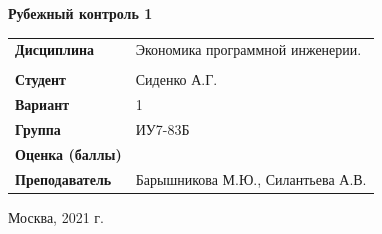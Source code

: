 \documentclass[a4paper,14pt]{extreport} %
\begin{document}
\begin{titlepage}
    \vspace{2cm}

    \begin{center}
        \textbf{Рубежный контроль 1} \\
        \vspace{0.5cm}
    \end{center}

    \vspace{4cm}

    \begin{flushleft}
        \begin{tabular}{ll}
            \textbf{Дисциплина} & Экономика программной инженерии.  \\
            \\
            \textbf{Студент} & Сиденко А.Г. \\
             \textbf{Вариант} & 1 \\
            \textbf{Группа} & ИУ7-83Б \\
            \textbf{Оценка (баллы)} & \\
            \textbf{Преподаватель} & Барышникова М.Ю., Силантьева А.В.   \\
        \end{tabular}
    \end{flushleft}

    \vspace{4cm}

   \begin{center}
        Москва, 2021 г.
    \end{center}

\end{titlepage}
\end{document}

